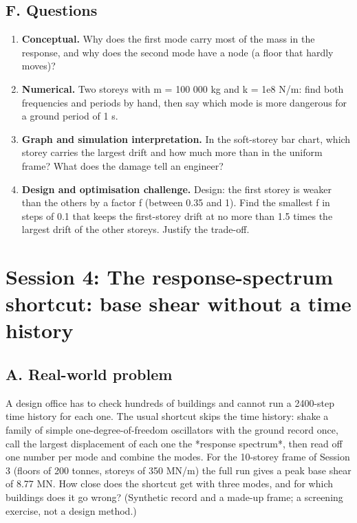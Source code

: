 \documentclass[11pt,a4paper]{article}
\begin{document}
\subsection*{F. Questions}
\begin{enumerate}[nosep]
\item \textbf{Conceptual.} Why does the first mode carry most of the mass in the response, and why does the second mode have a node (a floor that hardly moves)?
\item \textbf{Numerical.} Two storeys with m = 100 000 kg and k = 1e8 N/m: find both frequencies and periods by hand, then say which mode is more dangerous for a ground period of 1 s.
\item \textbf{Graph and simulation interpretation.} In the soft-storey bar chart, which storey carries the largest drift and how much more than in the uniform frame? What does the damage tell an engineer?
\item \textbf{Design and optimisation challenge.} Design: the first storey is weaker than the others by a factor f (between 0.35 and 1). Find the smallest f in steps of 0.1 that keeps the first-storey drift at no more than 1.5 times the largest drift of the other storeys. Justify the trade-off.
\end{enumerate}

\section{Session 4: The response-spectrum shortcut: base shear without a time history}

\subsection*{A. Real-world problem}
A design office has to check hundreds of buildings and cannot run a 2400-step time history for each one. The usual shortcut skips the time history: shake a family of simple one-degree-of-freedom oscillators with the ground record once, call the largest displacement of each one the *response spectrum*, then read off one number per mode and combine the modes. For the 10-storey frame of Session 3 (floors of 200 tonnes, storeys of 350 MN/m) the full run gives a peak base shear of 8.77 MN. How close does the shortcut get with three modes, and for which buildings does it go wrong? (Synthetic record and a made-up frame; a screening exercise, not a design method.)
\end{document}
